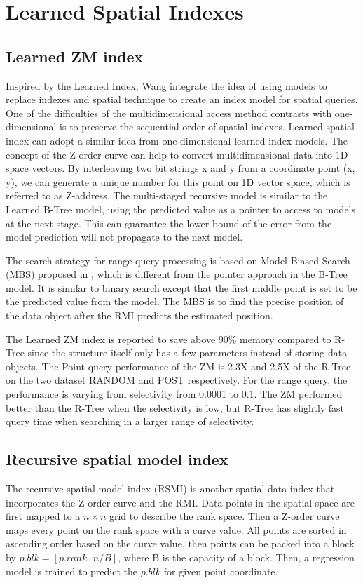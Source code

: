 \section{Learned Spatial Indexes}
\subsection{Learned ZM index}
Inspired by the Learned Index, Wang \cite{Wang:2019ks} integrate the idea of using models to replace indexes and spatial technique to create an index model for spatial queries. One of the difficulties of the multidimensional access method contrasts with one-dimensional is to preserve the sequential order of spatial indexes. Learned spatial index can adopt a similar idea from one dimensional learned index models. The concept of the Z-order curve can help to convert multidimensional data into 1D space vectors. By interleaving two bit strings x and y from a coordinate point (x, y), we can generate a unique number for this point on 1D vector space, which is referred to as Z-address. The multi-staged recursive model is similar to the Learned B-Tree model, using the predicted value as a pointer to access to models at the next stage. This can guarantee the lower bound of the error from the model prediction will not propagate to the next model. 

The search strategy for range query processing is based on Model Biased Search (MBS) proposed in \cite{Kraska:2017vh}, which is different from the pointer approach in the B-Tree model. It is similar to binary search except that the first middle point is set to be the predicted value from the model.  The MBS is to find the precise position of the data object after the RMI predicts the estimated position.

The Learned ZM index is reported to save above 90\% memory compared to R-Tree since the structure itself only has a few parameters instead of storing data objects. The Point query performance of the ZM is 2.3X and 2.5X of the R-Tree on the two dataset RANDOM and POST respectively. For the range query, the performance is varying from selectivity from 0.0001 to 0.1. The ZM performed better than the R-Tree when the selectivity is low, but R-Tree has slightly fast query time when searching in a larger range of selectivity. 



\subsection{Recursive spatial model index}
The recursive spatial model index (RSMI) \cite{Qi:2020uz} is another spatial data index that incorporates the Z-order curve and the RMI. Data points in the spatial space are first mapped to a $n \times n$ grid to describe the rank space. Then a Z-order curve maps every point on the rank space with a curve value. All points are sorted in ascending order based on the curve value, then points can be packed into a block by $p.blk = [p.rank \cdot n/B]$, where B is the capacity of a block. Then, a regression model is trained to predict the $p.blk$ for given point coordinate. 

